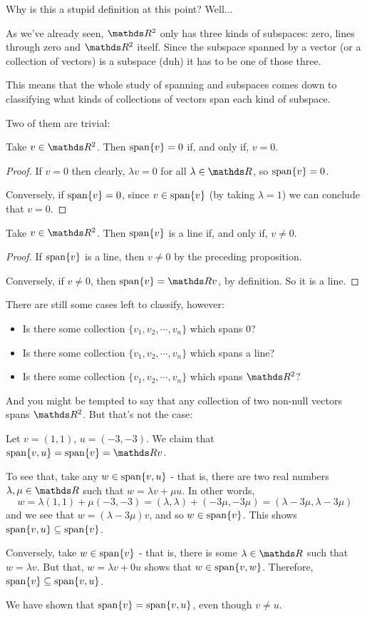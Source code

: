 Why is this a stupid definition at this point? Well...

As we've already seen, $\R^2$ only has three kinds of subspaces: zero, lines through zero and $\R^2$ itself. Since the subspace spanned by a vector (or a collection of vectors) is a subspace (duh) it has to be one of those three.

This means that the whole study of spanning and subspaces comes down to classifying what kinds of collections of vectors span each kind of subspace.

Two of them are trivial:

\begin{prop}
	Take $v\in \R^2$. Then $\operatorname{span}\{v\}=0$ if, and only if, $v=0$.
\end{prop}
\begin{proof}
	If $v=0$ then clearly, $\lambda v=0$ for all $\lambda \in \R$, so $\operatorname{span}\{v\}=0$.
	
	Conversely, if $\operatorname{span}\{v\}=0$, since $v\in\operatorname{span}\{v\}$ (by taking $\lambda=1$) we can conclude that $v=0$.
\end{proof}

\begin{prop}
	Take $v\in \R^2$. Then $\operatorname{span}\{v\}$ is a line if, and only if, $v\neq 0$.
\end{prop}
\begin{proof}
	If $\operatorname{span}\{v\}$ is a line, then $v\neq 0$ by the preceding proposition.
	
	Conversely, if $v\neq 0$, then $\spen\{v\}=\R v$, by definition. So it is a line.
\end{proof}

There are still some cases left to classify, however:
\begin{itemize}
	\item Is there some collection $\{v_1,v_2,\cdots,v_n\}$ which spans 0?
	\item Is there some collection $\{v_1,v_2,\cdots,v_n\}$ which spans a line?
	\item Is there some collection $\{v_1,v_2,\cdots,v_n\}$ which spans $\R^2$?
\end{itemize}

And you might be tempted to say that any collection of two non-null vectors spans $\R^2$. But that's not the case:

\begin{ex}
	Let $v=(1,1)$, $u=(-3,-3)$. We claim that $\spen\{v,u\}=\spen\{v\}=\R v$.
	
	To see that, take any $w\in \operatorname{span}\{v,u\}$ - that is, there are two real numbers $\lambda,\mu\in \R$ such that $w=\lambda v+\mu u$. In other words,
	\[w=\lambda(1,1)+\mu(-3,-3)=(\lambda,\lambda)+(-3\mu,-3\mu)=(\lambda-3\mu,\lambda-3\mu)\]and we see that $w=(\lambda-3\mu)v$, and so $w\in \operatorname{span}\{v\}$. This shows $\operatorname{span}\{v,u\}\subseteq\operatorname{span}\{v\}$.
	
	Conversely, take $w\in \operatorname{span}\{v\}$ - that is, there is some $\lambda\in \R$ such that $w=\lambda v$. But that, $w=\lambda v+0u$ shows that $w\in\operatorname{span}\{v,w\}$. Therefore, $\operatorname{span}\{v\}\subseteq\operatorname{span}\{v,u\}$.
	
	We have shown that $\operatorname{span}\{v\}=\operatorname{span}\{v,u\}$, even though $v\neq u$.
\end{ex}

